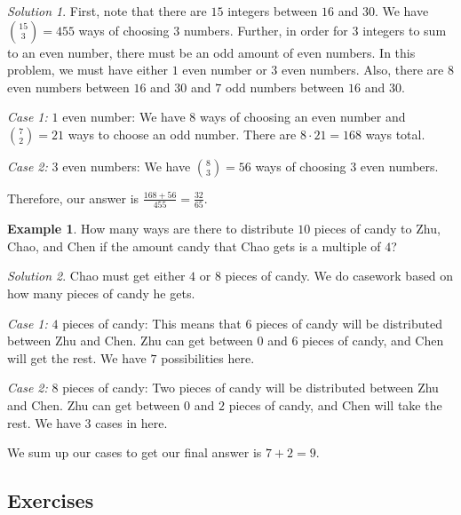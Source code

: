 \documentclass[l1pt]{article}
\theoremstyle{plain}
\theoremstyle{definition}
\newtheorem{example}[thm]{Example}
\theoremstyle{remark}
\newtheorem*{solution}{Solution}
\begin{document}
\begin{solution}
First, note that there are $15$ integers between $16$ and $30$. We have $\binom{15}{3}=455$ ways of choosing $3$ numbers. Further, in order for $3$ integers to sum to an even number, there must be an odd amount of even numbers. In this problem, we must have either $1$ even number or $3$ even numbers. Also, there are $8$ even numbers between $16$ and $30$ and $7$ odd numbers between $16$ and $30$.
\newline

\textit{Case 1:} $1$ even number: We have $8$ ways of choosing an even number and $\binom{7}{2}=21$ ways to choose an odd number. There are $8\cdot 21=168$ ways total.
\newline

\textit{Case 2:} $3$ even numbers: We have $\binom{8}{3}=56$ ways of choosing $3$ even numbers. 
\newline

Therefore, our answer is $\frac{168+56}{455}=\frac{32}{65}$.

\end{solution}



\begin{example}
How many ways are there to distribute $10$ pieces of candy to Zhu, Chao, and Chen if the amount candy that Chao gets is a multiple of $4$?
\end{example}

\begin{solution}
Chao must get either $4$ or $8$ pieces of candy. We do casework based on how many pieces of candy he gets.
\newline

\textit{Case 1:} $4$ pieces of candy: This means that $6$ pieces of candy will be distributed between Zhu and Chen. Zhu can get between $0$ and $6$ pieces of candy, and Chen will get the rest. We have $7$ possibilities here.
\newline

\textit{Case 2:} $8$ pieces of candy: Two pieces of candy will be distributed between Zhu and Chen. Zhu can get between $0$ and $2$ pieces of candy, and Chen will take the rest. We have $3$ cases in here.
\newline

We sum up our cases to get our final answer is $7+2=9$.
\end{solution}

\subsection*{Exercises}
\end{document}
